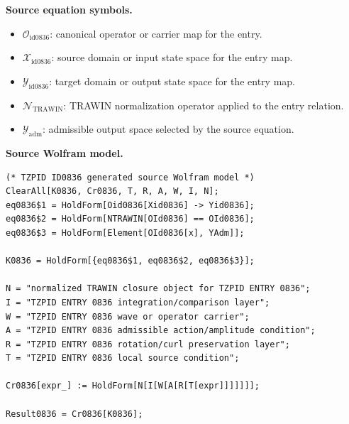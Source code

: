 \begin{minipage}[t]{0.49\linewidth}
\begingroup
\small
\raggedright
\textbf{Source equation symbols.}\par
\begin{itemize}[leftmargin=1.35em,itemsep=1pt,topsep=1pt,parsep=0pt]
    \item $\mathcal{O}_{\mathrm{id0836}}$: canonical operator or carrier map for the entry.
    \item $\mathcal{X}_{\mathrm{id0836}}$: source domain or input state space for the entry map.
    \item $\mathcal{Y}_{\mathrm{id0836}}$: target domain or output state space for the entry map.
    \item $\mathcal{N}_{\mathrm{TRAWIN}}$: TRAWIN normalization operator applied to the entry relation.
    \item $\mathcal{Y}_{\mathrm{adm}}$: admissible output space selected by the source equation.
\end{itemize}
\endgroup
\end{minipage}\hfill
\begin{minipage}[t]{0.47\linewidth}
\begingroup
\scriptsize
\raggedright
\textbf{Source Wolfram model.}\par
\begin{Verbatim}[fontsize=\tiny,breaklines=true,breakanywhere=true]
(* TZPID ID0836 generated source Wolfram model *)
ClearAll[K0836, Cr0836, T, R, A, W, I, N];
eq0836$1 = HoldForm[Oid0836[Xid0836] -> Yid0836];
eq0836$2 = HoldForm[NTRAWIN[OId0836] == OId0836];
eq0836$3 = HoldForm[Element[OId0836[x], YAdm]];

K0836 = HoldForm[{eq0836$1, eq0836$2, eq0836$3}];

N = "normalized TRAWIN closure object for TZPID ENTRY 0836";
I = "TZPID ENTRY 0836 integration/comparison layer";
W = "TZPID ENTRY 0836 wave or operator carrier";
A = "TZPID ENTRY 0836 admissible action/amplitude condition";
R = "TZPID ENTRY 0836 rotation/curl preservation layer";
T = "TZPID ENTRY 0836 local source condition";

Cr0836[expr_] := HoldForm[N[I[W[A[R[T[expr]]]]]]];

Result0836 = Cr0836[K0836];
\end{Verbatim}
\endgroup
\end{minipage}

